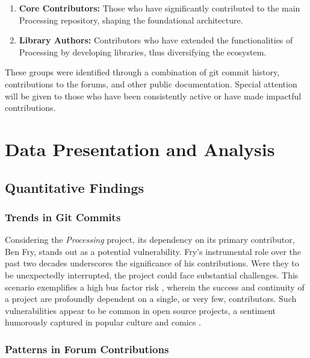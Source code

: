 \documentclass{article}
\begin{document}
\begin{enumerate}
    \item \textbf{Core Contributors:} Those who have significantly contributed to the main Processing repository, shaping the foundational architecture.
    \item \textbf{Library Authors:} Contributors who have extended the functionalities of Processing by developing libraries, thus diversifying the ecosystem.
\end{enumerate}

These groups were identified through a combination of git commit history, contributions to the forums, and other public documentation. Special attention will be given to those who have been consistently active or have made impactful contributions.

\section{Data Presentation and Analysis}

\subsection{Quantitative Findings}

\subsubsection{Trends in Git Commits}

Considering the \textit{Processing} project, its dependency on its primary contributor, Ben Fry, stands out as a potential vulnerability. Fry's instrumental role over the past two decades underscores the significance of his contributions. Were they to be unexpectedly interrupted, the project could face substantial challenges. This scenario exemplifies a high bus factor risk \parencite{BusFactor2023}, wherein the success and continuity of a project are profoundly dependent on a single, or very few, contributors. Such vulnerabilities appear to be common in open source projects, a sentiment humorously captured in popular culture and comics \parencite{munroeDependency2020}.



% 

\subsubsection{Patterns in Forum Contributions}
\end{document}
